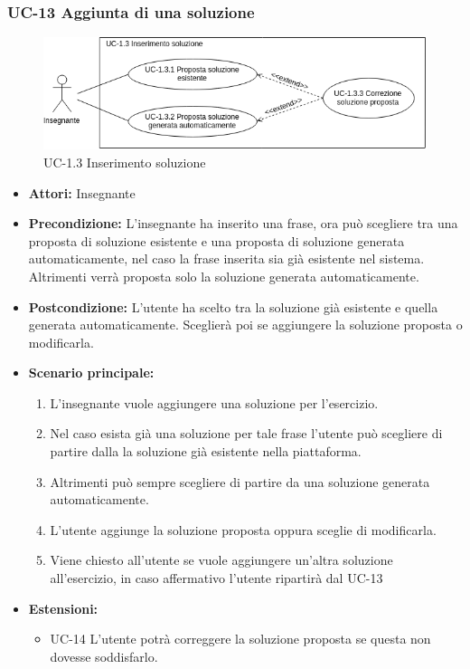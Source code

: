 \subsubsection{UC-13 Aggiunta di una soluzione}
\begin{figure}[htbp]
	\centering
	\includegraphics[scale=0.7]{images/UC-1_3.png}
	\caption{UC-1.3 Inserimento soluzione}
\end{figure}
\begin{itemize}
\item \textbf{Attori: }Insegnante

\item \textbf{Precondizione: }L'insegnante ha inserito una frase, ora può scegliere tra una proposta di soluzione esistente e una proposta di soluzione generata automaticamente, nel caso la frase inserita sia già esistente nel sistema. Altrimenti verrà proposta solo la soluzione generata automaticamente.
\item \textbf{Postcondizione: }L'utente ha scelto tra la soluzione già esistente e quella generata automaticamente. Sceglierà poi se aggiungere la soluzione proposta o modificarla.
\item \textbf{Scenario principale: }
		\begin{enumerate}
		\item L'insegnante vuole aggiungere una soluzione per l'esercizio. 
		\item Nel caso esista già una soluzione per tale frase l'utente può scegliere di partire dalla la soluzione già esistente nella piattaforma.
		\item Altrimenti può sempre scegliere di partire da una soluzione generata automaticamente. 
		\item L'utente aggiunge la soluzione proposta oppura sceglie di modificarla. 
		\item Viene chiesto all'utente se vuole aggiungere un'altra soluzione all'esercizio, in 
		caso affermativo l'utente ripartirà dal UC-13
		\end{enumerate}	
\item \textbf{Estensioni: }
		\begin{itemize}
		\item UC-14 L'utente potrà correggere la soluzione proposta se questa non dovesse soddisfarlo.
		\end{itemize}
\end{itemize}


